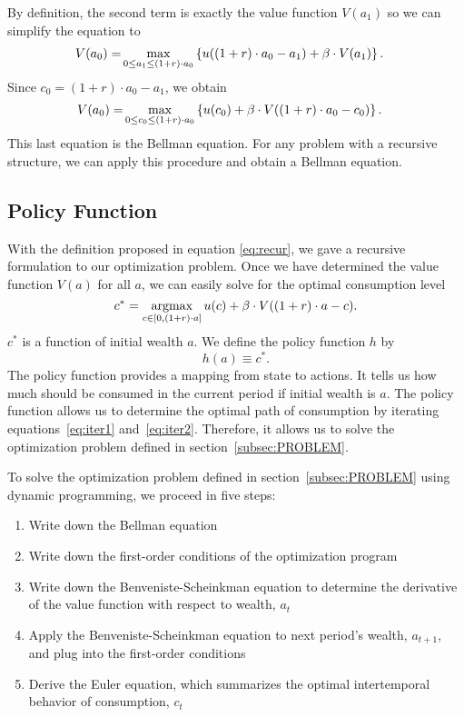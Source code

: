 \documentclass[letterpaper,12pt,leqno]{article}
\begin{document}
By definition, the second term is exactly the value function $V(a_{1})$ so we can simplify the equation to
\begin{align*}
V(a_0)=&\max_{0\leq a_{1}\leq (1+r)\cdot a_0}\bc{u((1+r)\cdot a_0-a_1)+\b \cdot  V(a_1)}.
\end{align*}
Since $c_{0}=(1+r)\cdot a_0-a_1$, we obtain
\begin{align*}
V(a_0)=&\max_{0\leq c_{0}\leq (1+r)\cdot a_0}\bc{u(c_0)+\b \cdot  V((1+r)\cdot a_0-c_0)}.
\end{align*}
This last equation is the Bellman equation. For any problem with a recursive structure, we can apply this procedure and obtain a Bellman equation.

\subsection{Policy Function}

With the definition proposed in equation \eqref{eq:recur}, we gave a recursive formulation to our optimization problem. Once we have determined the value function $V(a)$ for all $a$, we can easily solve for the optimal consumption level
\begin{equation*}
c^*=\operatorname*{argmax}_{c\in[0,(1+r)\cdot a]}u(c)+\beta  \cdot V((1+r)\cdot a-c).
\end{equation*}
$c^*$ is a function of initial wealth $a$. We define the policy function $h$ by
\begin{equation*}
h(a)\equiv c^*.
\end{equation*}
The policy function provides a mapping from state to actions. It tells us how much should be consumed in the current period if initial wealth is $a$. The policy function allows us to  determine the optimal path of consumption by iterating equations~\eqref{eq:iter1} and~\eqref{eq:iter2}.  Therefore, it allows us to solve  the optimization problem defined in section~\ref{subsec:PROBLEM}.  

To solve the optimization problem defined in section~\ref{subsec:PROBLEM} using dynamic programming, we proceed in five steps:
\begin{enumerate}
 \item Write down the Bellman equation
 \item Write down the first-order conditions of the optimization program
 \item Write down the Benveniste-Scheinkman equation to determine the derivative of the value function with respect to wealth, $a_{t}$
\item Apply the Benveniste-Scheinkman equation to next period's wealth, $a_{t+1}$, and plug into the first-order
conditions
 \item Derive the Euler equation, which summarizes the optimal intertemporal behavior of consumption, $c_{t}$
\end{enumerate}
\end{document}
